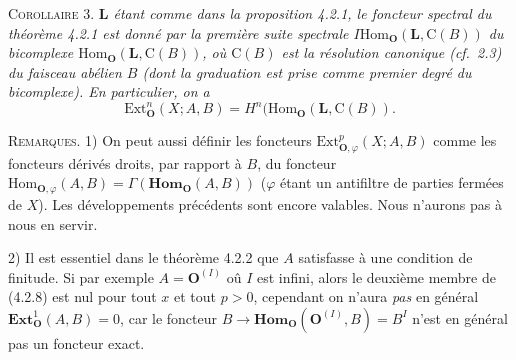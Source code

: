 \textsc{Corollaire 3.} \textit{$\mathbf{L}$ étant comme dans la
proposition \textup{4.2.1}, le foncteur spectral du théorème \textup{4.2.1} est donné par la
première suite spectrale
$I\mathrm{Hom}_{\mathbf O}(\mathbf{L},{\mathrm C}(B))$ du bicomplexe
$\mathrm{Hom}_{\mathbf O}(\mathbf{L},{\mathrm C}(B))$, où ${\mathrm C}(B)$ est la résolution canonique
\textup{(}cf.\ \textup{2.3)} du faisceau abélien $B$ \textup{(}dont la graduation est prise comme premier
degré du bicomplexe\textup{)}. En particulier, on a}
\[
\mathrm{Ext}_{\mathbf O}^n(X;A,B)=
H^n(\mathrm{Hom}_{\mathbf O}(\mathbf{L},{\mathrm C}(B)).
\]

\textsc{Remarques.} 1) On peut aussi définir les foncteurs
$\mathrm{Ext}_{{\mathbf O},\varphi}^p(X;A,B)$ comme les foncteurs dérivés droits, par
rapport à $B$, du foncteur
$\mathrm{Hom}_{{\mathbf O},\varphi}(A,B)=
\Gamma(\mathbf{Hom}_{\mathbf O}(A,B))$ ($\varphi$ étant un antifiltre de parties
fermées de $X$). Les développements précédents sont encore valables. Nous
n'aurons pas à nous en servir.

2) Il est essentiel dans le théorème 4.2.2 que $A$ satisfasse à une condition
de finitude. Si par exemple $A={\mathbf O}^{(I)}$ oû $I$ est infini, alors le deuxième
membre de (4.2.8) est nul pour tout $x$ et tout $p>0$, cependant on n'aura
\textit{pas} en général $\mathbf{Ext}_{\mathbf O}^1(A,B)=0$, car le foncteur
$B\to\mathbf{Hom}_{\mathbf O}({\mathbf O}^{(I)},B)=B^I$ n'est en général pas un foncteur
exact.

